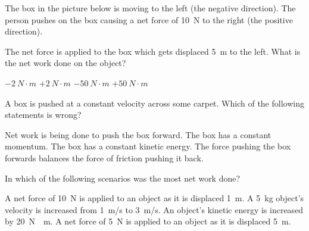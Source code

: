 \documentclass[answers]{exam}
\begin{document}
\begin{questions}


\question
The box in the picture below is moving to the left (the negative direction). The person pushes on the box causing a net force of \SI{10}{N} to the right (the positive direction).

\begin{center}
\end{center}

The net force is applied to the box which gets displaced \SI{5}{m} to the left.  What is the net work done on the object? 

\begin{randomizeoneparchoices}[norandomize]
    \choice $-\SI{2}{N\cdot m}$
    \choice $+\SI{2}{N\cdot m}$
    \correctchoice $-\SI{50}{N\cdot m}$
    \choice $+\SI{50}{N\cdot m}$
\end{randomizeoneparchoices}

\clearpage

\question
A box is pushed at a constant velocity across some carpet.  Which of the following statements is wrong?

\begin{randomizechoices}[norandomize]
    \correctchoice Net work is being done to push the box forward.
    \choice The box has a constant momentum.
    \choice The box has a constant kinetic energy.
    \choice The force pushing the box forwards balances the force of friction pushing it back.
\end{randomizechoices}

\question
In which of the following scenarios was the most net work done?

\begin{randomizechoices}[norandomize]
    \choice A net force of \SI{10}{N} is applied to an object as it is displaced \SI{1}{m}.
    \choice A \SI{5}{kg} object's velocity is increased from \SI{1}{m/s} to \SI{3}{m/s}.
    \choice An object's kinetic energy is increased by \SI{20}{N\cdot m}.
    \correctchoice A net force of \SI{5}{N} is applied to an object as it is displaced \SI{5}{m}.
\end{randomizechoices}


\end{questions}
\end{document}
